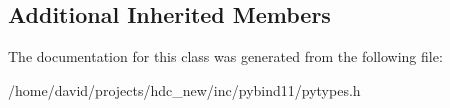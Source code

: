 \subsection*{Additional Inherited Members}


The documentation for this class was generated from the following file\+:\begin{DoxyCompactItemize}
\item 
/home/david/projects/hdc\+\_\+new/inc/pybind11/pytypes.\+h\end{DoxyCompactItemize}
